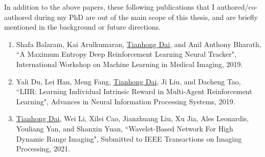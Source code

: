 In addition to the above papers, these following publications that I authored/co-authored during my PhD are out of the main scope of this thesis, and are briefly mentioned in the background or future directions.
\begin{enumerate}
	\item Shafa Balaram, Kai Arulkumaran, \underline{Tianhong Dai}, and Anil Anthony Bharath, ``A Maximum Entropy Deep Reinforcement Learning Neural Tracker", International Workshop on Machine Learning in Medical Imaging, 2019.
	\item Yali Du, Lei Han, Meng Fang, \underline{Tianhong Dai}, Ji Liu, and Dacheng Tao, ``LIIR: Learning Individual Intrinsic Reward in Multi-Agent Reinforcement Learning", Advances in Neural Information Processing Systems, 2019.
	\item \underline{Tianhong Dai}, Wei Li, Xilei Cao, Jianzhuang Liu, Xu Jia, Ales Leonardis, Youliang Yan, and Shanxin Yuan, ``Wavelet-Based Network For High Dynamic Range Imaging", Submitted to IEEE Transactions on Imaging Processing, 2021.
\end{enumerate}